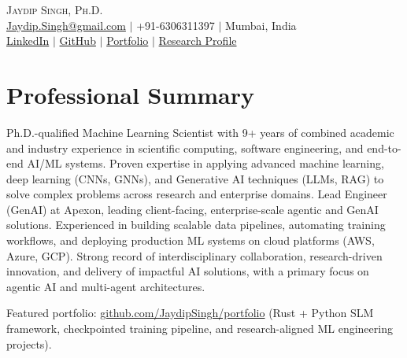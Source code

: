 \documentclass[a4paper,10pt]{article}
\begin{document}
\begin{center}
    {\Huge \scshape Jaydip Singh, Ph.D.} \\ \vspace{5pt}
  \href{mailto:jaydip.singh@gmail.com}{Jaydip.Singh@gmail.com} $|$ +91-6306311397 $|$ Mumbai, India \\
    \href{https://www.linkedin.com/in/jaydip-singh-15714546}{LinkedIn} $|$
  \href{https://github.com/JaydipSingh}{GitHub} $|$
  \href{https://github.com/JaydipSingh/portfolio}{Portfolio} $|$
  \href{https://inspirehep.net/authors/1591917}{Research Profile}
\end{center}

\section{Professional Summary}
Ph.D.-qualified Machine Learning Scientist with 9+ years of combined academic and industry experience in scientific computing, software engineering, and end-to-end AI/ML systems. Proven expertise in applying advanced machine learning, deep learning (CNNs, GNNs), and Generative AI techniques (LLMs, RAG) to solve complex problems across research and enterprise domains. Lead Engineer (GenAI) at Apexon, leading client-facing, enterprise-scale agentic and GenAI solutions. Experienced in building scalable data pipelines, automating training workflows, and deploying production ML systems on cloud platforms (AWS, Azure, GCP). Strong record of interdisciplinary collaboration, research-driven innovation, and delivery of impactful AI solutions, with a primary focus on agentic AI and multi-agent architectures.

Featured portfolio: \href{https://github.com/JaydipSingh/portfolio}{github.com/JaydipSingh/portfolio} (Rust + Python SLM framework, checkpointed training pipeline, and research-aligned ML engineering projects).
\end{document}

